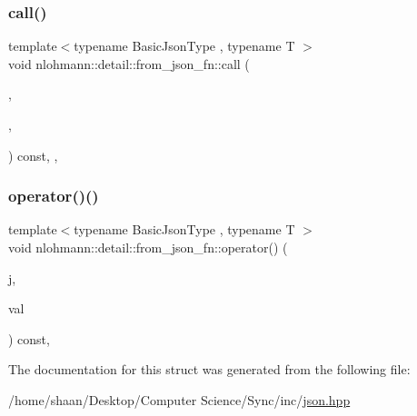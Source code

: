 \subsubsection{\texorpdfstring{call()}{call()}\hspace{0.1cm}{\footnotesize\ttfamily [2/2]}}
{\footnotesize\ttfamily template$<$typename Basic\+Json\+Type , typename T $>$ \\
void nlohmann\+::detail\+::from\+\_\+json\+\_\+fn\+::call (\begin{DoxyParamCaption}\item[{const Basic\+Json\+Type \&}]{,  }\item[{T \&}]{,  }\item[{\hyperlink{structnlohmann_1_1detail_1_1priority__tag}{priority\+\_\+tag}$<$ 0 $>$}]{ }\end{DoxyParamCaption}) const\hspace{0.3cm}{\ttfamily [inline]}, {\ttfamily [private]}, {\ttfamily [noexcept]}}

\mbox{\label{structnlohmann_1_1detail_1_1from__json__fn_a48e82ad9d244fdf249caa970a253e214}} 
\subsubsection{\texorpdfstring{operator()()}{operator()()}}
{\footnotesize\ttfamily template$<$typename Basic\+Json\+Type , typename T $>$ \\
void nlohmann\+::detail\+::from\+\_\+json\+\_\+fn\+::operator() (\begin{DoxyParamCaption}\item[{const Basic\+Json\+Type \&}]{j,  }\item[{T \&}]{val }\end{DoxyParamCaption}) const\hspace{0.3cm}{\ttfamily [inline]}, {\ttfamily [noexcept]}}



The documentation for this struct was generated from the following file\+:\begin{DoxyCompactItemize}
\item 
/home/shaan/\+Desktop/\+Computer Science/\+Sync/inc/\hyperlink{json_8hpp}{json.\+hpp}\end{DoxyCompactItemize}
